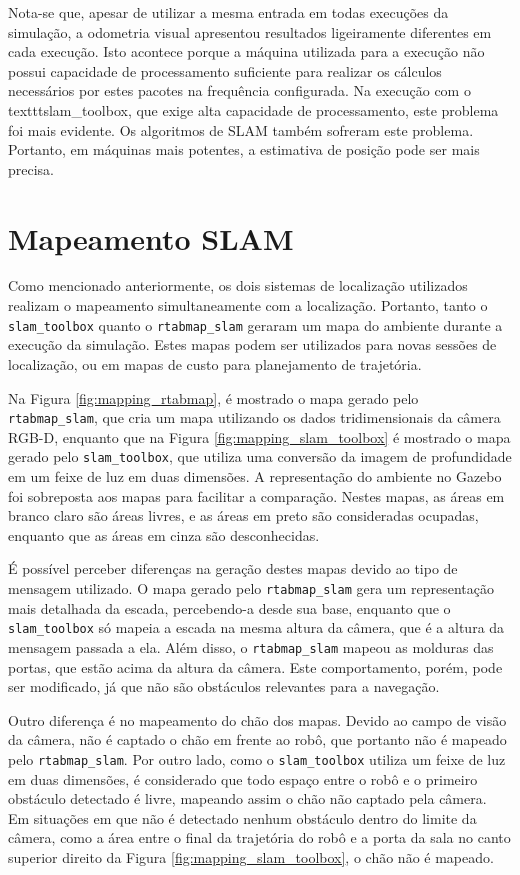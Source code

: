 \documentclass[repeatfields,xlists,xpacks,oneside,yearsonly]{ufrgscca}
\begin{document}
Nota-se que, apesar de utilizar a mesma entrada em todas execuções da simulação, a
odometria visual apresentou resultados ligeiramente diferentes em cada execução.
Isto acontece porque a máquina utilizada para a execução não possui capacidade de
processamento suficiente para realizar os cálculos necessários por estes pacotes
na frequência configurada. Na execução com o texttt{slam\_toolbox}, que exige
alta capacidade de processamento, este problema foi mais evidente.
Os algoritmos de SLAM também sofreram este problema.
Portanto, em máquinas mais potentes, a estimativa de posição pode ser mais precisa.

\section{Mapeamento SLAM}

Como mencionado anteriormente, os dois sistemas de localização utilizados realizam
o mapeamento simultaneamente com a localização. Portanto, tanto o \texttt{slam\_toolbox}
quanto o \texttt{rtabmap\_slam} geraram um mapa do ambiente durante a execução da
simulação.
Estes mapas podem ser utilizados para novas sessões de localização, ou em mapas
de custo para planejamento de trajetória.

Na Figura \ref{fig:mapping_rtabmap}, é mostrado o mapa gerado pelo
\texttt{rtabmap\_slam}, que cria um mapa utilizando os dados tridimensionais da
câmera RGB-D, enquanto que na Figura \ref{fig:mapping_slam_toolbox} é mostrado o
mapa gerado pelo \texttt{slam\_toolbox}, que utiliza uma conversão da imagem de
profundidade em um feixe de luz em duas dimensões. A representação do ambiente
no Gazebo foi sobreposta aos mapas para facilitar a comparação.
Nestes mapas, as áreas em branco claro são áreas livres, e as áreas em preto são
consideradas ocupadas, enquanto que as áreas em cinza são desconhecidas.

É possível perceber diferenças na geração destes mapas devido ao tipo de mensagem
utilizado. O mapa gerado pelo \texttt{rtabmap\_slam} gera um representação mais
detalhada da escada, percebendo-a desde sua base, enquanto que o \texttt{slam\_toolbox}
só mapeia a escada na mesma altura da câmera, que é a altura da mensagem passada
a ela.
Além disso, o \texttt{rtabmap\_slam} mapeou as molduras das portas, que estão acima
da altura da câmera. Este comportamento, porém, pode ser modificado, já que
não são obstáculos relevantes para a navegação.

Outro diferença é no mapeamento do chão dos mapas.
Devido ao campo de visão da câmera, não é captado o chão em frente ao robô, que
portanto não é mapeado pelo \texttt{rtabmap\_slam}. Por outro lado, como o
\texttt{slam\_toolbox} utiliza um feixe de luz em duas dimensões, é considerado
que todo espaço entre o robô e o primeiro obstáculo detectado é livre, mapeando
assim o chão não captado pela câmera.
Em situações em que não é detectado nenhum obstáculo dentro do limite da câmera,
como a área entre o final da trajetória do robô e a porta da sala no canto superior
direito da Figura \ref{fig:mapping_slam_toolbox}, o chão não é mapeado.
\end{document}
